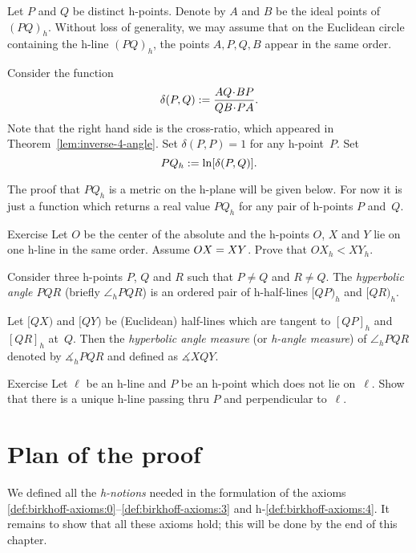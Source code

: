 \label{h-dist}
Let $P$ and $Q$ be distinct h-points.
Denote by $A$ and $B$ be the ideal points of $(PQ)_h$.
Without loss of generality, we may assume that on the Euclidean circle containing the h-line $(PQ)_h$, the points $A,P,Q,B$ appear in the same order.

Consider the function 
$$\delta(P,Q)\df\frac{AQ\cdot BP}{QB\cdot PA}.$$
Note that the right hand side is the cross-ratio, 
which appeared in Theorem~\ref{lem:inverse-4-angle}.
Set $\delta(P,P)=1$ for any h-point~$P$.
Set 
$$PQ_h:=\ln[\delta(P,Q)].$$

The proof that $PQ_h$ is a metric on the h-plane will be given below.
For now it is just a function which returns a real value $PQ_h$ for any pair of h-points $P$ and~$Q$.

\begin{thm}{Exercise}\label{ex:h-dist-eq}
Let $O$ be the center of the absolute and the h-points $O$, $X$ and $Y$ lie on one h-line in the same order.
Assume $OX\z=XY$.
Prove that $OX_h<XY_h$.
\end{thm}


\label{h-angle measure}
Consider three h-points $P$, $Q$ and $R$
such that $P\ne Q$ and $R\ne Q$.
The \emph{hyperbolic angle $PQR$} (briefly $\angle_h PQR$) is an ordered pair of h-half-lines $[QP)_h$ and $[QR)_h$.

Let $[QX)$ and $[QY)$ be (Euclidean) half-lines 
which are tangent to $[QP]_h$ and $[QR]_h$ 
at~$Q$.
Then the \emph{hyperbolic angle measure} (or \emph{h-angle measure})  of $\angle_h PQR$ denoted by
$\measuredangle_h PQR$ and defined as
$\measuredangle XQY$.

\begin{thm}{Exercise}\label{ex:h-perp-unique}
Let $\ell$ be an h-line and $P$ be an h-point which does not lie on~$\ell$.
Show that there is a unique h-line passing thru $P$ 
and perpendicular to~$\ell$.
\end{thm}

\section*{Plan of the proof}

We defined all the {}\emph{h-notions} needed in the formulation of the axioms \ref{def:birkhoff-axioms:0}--\ref{def:birkhoff-axioms:3} and h-\ref{def:birkhoff-axioms:4}.
It remains to show that all these axioms hold; 
this will be done by the end of this chapter.

